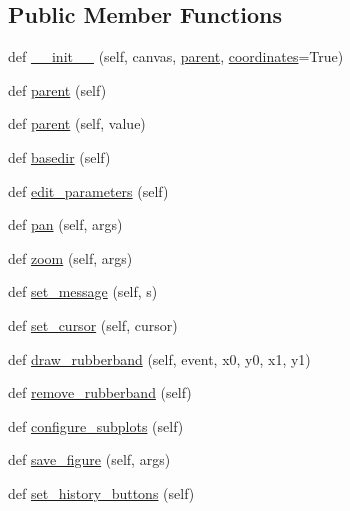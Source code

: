 \subsection*{Public Member Functions}
\begin{DoxyCompactItemize}
\item 
def \hyperlink{classmatplotlib_1_1backends_1_1backend__qt5_1_1NavigationToolbar2QT_a63a165dfc0bd0b1657e1615efd5364a7}{\+\_\+\+\_\+init\+\_\+\+\_\+} (self, canvas, \hyperlink{classmatplotlib_1_1backends_1_1backend__qt5_1_1NavigationToolbar2QT_ae5576ca249bf73c9bd27682f62151170}{parent}, \hyperlink{classmatplotlib_1_1backends_1_1backend__qt5_1_1NavigationToolbar2QT_a59714a4d9560a09131687e980a80cdb5}{coordinates}=True)
\item 
def \hyperlink{classmatplotlib_1_1backends_1_1backend__qt5_1_1NavigationToolbar2QT_ae5576ca249bf73c9bd27682f62151170}{parent} (self)
\item 
def \hyperlink{classmatplotlib_1_1backends_1_1backend__qt5_1_1NavigationToolbar2QT_a36ba447d7e606900a9eb4d24fa61e00e}{parent} (self, value)
\item 
def \hyperlink{classmatplotlib_1_1backends_1_1backend__qt5_1_1NavigationToolbar2QT_a1cf6cd706240b5c5f1fe9ed39c75c0f3}{basedir} (self)
\item 
def \hyperlink{classmatplotlib_1_1backends_1_1backend__qt5_1_1NavigationToolbar2QT_a5985292293282d0378a437494f08e0b0}{edit\+\_\+parameters} (self)
\item 
def \hyperlink{classmatplotlib_1_1backends_1_1backend__qt5_1_1NavigationToolbar2QT_a741c16d4cbe180c967cb62bafebd3c9b}{pan} (self, args)
\item 
def \hyperlink{classmatplotlib_1_1backends_1_1backend__qt5_1_1NavigationToolbar2QT_a39c2bac8d487a6dc88fa9c210e2843ea}{zoom} (self, args)
\item 
def \hyperlink{classmatplotlib_1_1backends_1_1backend__qt5_1_1NavigationToolbar2QT_af5f5590817eb61259af565a515be09f5}{set\+\_\+message} (self, s)
\item 
def \hyperlink{classmatplotlib_1_1backends_1_1backend__qt5_1_1NavigationToolbar2QT_aaefcaf0c378b33ade903ab5b8778490e}{set\+\_\+cursor} (self, cursor)
\item 
def \hyperlink{classmatplotlib_1_1backends_1_1backend__qt5_1_1NavigationToolbar2QT_a678537bdd65cb10fe5e494d0cdb04692}{draw\+\_\+rubberband} (self, event, x0, y0, x1, y1)
\item 
def \hyperlink{classmatplotlib_1_1backends_1_1backend__qt5_1_1NavigationToolbar2QT_a2a68ceab3e21dda940c05f507c900438}{remove\+\_\+rubberband} (self)
\item 
def \hyperlink{classmatplotlib_1_1backends_1_1backend__qt5_1_1NavigationToolbar2QT_a7608951ca367a0adbad48076bbd2b634}{configure\+\_\+subplots} (self)
\item 
def \hyperlink{classmatplotlib_1_1backends_1_1backend__qt5_1_1NavigationToolbar2QT_a7f917bdb4b3fd73b78b715a304816e7e}{save\+\_\+figure} (self, args)
\item 
def \hyperlink{classmatplotlib_1_1backends_1_1backend__qt5_1_1NavigationToolbar2QT_ad7c7798a8a255b96f320cce2d4cf6b47}{set\+\_\+history\+\_\+buttons} (self)
\end{DoxyCompactItemize}
